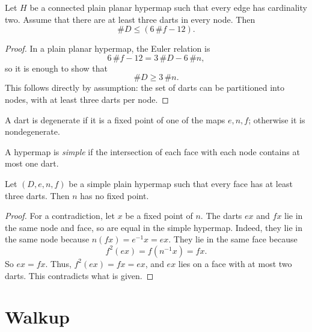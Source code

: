 \begin{lemma}\label{lemma:dart-upper} 
Let $H$ be a connected plain planar hypermap such that every edge has cardinality two.  Assume that
there are at least three darts in every node.  Then
$$
\# D \le (6\, \#f - 12).
$$
\end{lemma}

\begin{proof}  In a plain planar hypermap, the Euler relation is
$$6\, \#f - 12 = 3\,\#D - 6\,\#n,$$
so it is enough to show that
$$
\# D \ge 3\,\#n.
$$
This follows directly by assumption: the set of darts can be partitioned into nodes, with at least three darts per node.
\end{proof}



\begin{definition}[degenerate] A dart is degenerate if it is a
fixed point of one of the maps $e,n,f$; otherwise it is nondegenerate.  
\end{definition}

\begin{definition}[simple] 
A hypermap is {\it simple} if the intersection of each face with each node contains at most one dart.
\end{definition}


\begin{lemma} 
Let $(D,e,n,f)$ be a simple plain hypermap such that every face has
at least three darts.
Then $n$ has no fixed point.
\end{lemma}

\begin{proof}  For a contradiction, let $x$ be a fixed point of $n$. The darts $e x$ and $f x$ lie in the same node and face, so are equal in the simple hypermap.  Indeed, they lie in the same node because $n(f x) = e^{-1} x = e x$. They lie in the same face because     
  $$f^2 (e x) =  f(n^{-1} x) = f x.$$
So $e x = f x$.   Thus, $f^2 (e x) = f x = e x$, and $e x$ lies on a face with at most two darts.  This contradicts what is given.
\end{proof}




\section{Walkup}


